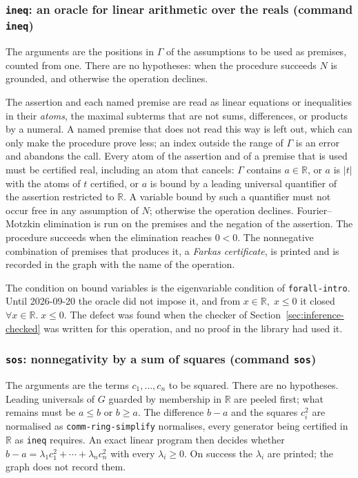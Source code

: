 \subsubsection*{\texttt{ineq}: an oracle for linear arithmetic over the reals
  (command \texttt{ineq})}

The arguments are the positions in $\Gamma$ of the assumptions to be used
as premises, counted from one.  There are no hypotheses: when the
procedure succeeds $N$ is grounded, and otherwise the operation declines.

The assertion and each named premise are read as linear equations or
inequalities in their \emph{atoms}, the maximal subterms that are not
sums, differences, or products by a numeral.  A named premise that does
not read this way is left out, which can only make the procedure prove
less; an index outside the range of $\Gamma$ is an error and abandons the
call.  Every atom of the assertion and of a premise that is used must be
certified real, including an atom that cancels: $\Gamma$ contains
$a \in \mathbb{R}$, or $a$ is $|t|$ with the atoms of $t$ certified, or
$a$ is bound by a leading universal quantifier of the assertion
restricted to $\mathbb{R}$.  A variable bound by such a quantifier must
not occur free in any assumption of $N$; otherwise the operation
declines.  Fourier--Motzkin elimination is run on the premises and the
negation of the assertion.  The procedure succeeds when the elimination
reaches $0 < 0$.  The nonnegative combination of premises that produces
it, a \emph{Farkas certificate}, is printed and is recorded in the graph
with the name of the operation.

\begin{remark}
The condition on bound variables is the eigenvariable condition of
\texttt{forall-intro}.  Until 2026-09-20 the oracle did not impose it,
and from $x \in \mathbb{R},\; x \leq 0$ it closed
$\forall x \in \mathbb{R}.\; x \leq 0$.  The defect was found when the
checker of Section~\ref{sec:inference-checked} was written for this
operation, and no proof in the library had used it.
\end{remark}

\subsubsection*{\texttt{sos}: nonnegativity by a sum of squares
  (command \texttt{sos})}

The arguments are the terms $c_1, \ldots, c_n$ to be squared.  There are
no hypotheses.  Leading universals of $G$ guarded by membership in
$\mathbb{R}$ are peeled first; what remains must be $a \leq b$ or
$b \geq a$.  The difference $b - a$ and the squares $c_i^2$ are
normalised as \texttt{comm-ring-simplify} normalises, every generator
being certified in $\mathbb{R}$ as \texttt{ineq} requires.  An exact
linear program then decides whether
$b - a = \lambda_1 c_1^2 + \cdots + \lambda_n c_n^2$ with every
$\lambda_i \geq 0$.  On success the $\lambda_i$ are printed; the graph
does not record them.

